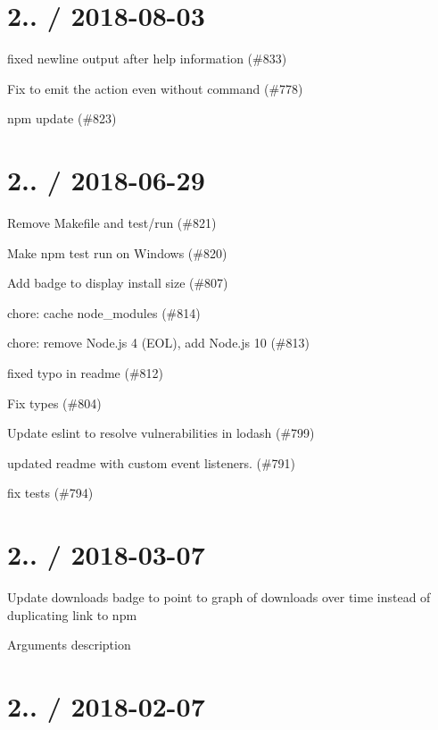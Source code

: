 \section*{2.. / 2018-\/08-\/03 }


\begin{DoxyItemize}
\item fixed newline output after help information (\#833)
\item Fix to emit the action even without command (\#778)
\item npm update (\#823)
\end{DoxyItemize}

\section*{2.. / 2018-\/06-\/29 }


\begin{DoxyItemize}
\item Remove Makefile and {\ttfamily test/run} (\#821)
\item Make \textquotesingle{}npm test\textquotesingle{} run on Windows (\#820)
\item Add badge to display install size (\#807)
\item chore\+: cache node\+\_\+modules (\#814)
\item chore\+: remove Node.\+js 4 (E\+OL), add Node.\+js 10 (\#813)
\item fixed typo in readme (\#812)
\item Fix types (\#804)
\item Update eslint to resolve vulnerabilities in lodash (\#799)
\item updated readme with custom event listeners. (\#791)
\item fix tests (\#794)
\end{DoxyItemize}

\section*{2.. / 2018-\/03-\/07 }


\begin{DoxyItemize}
\item Update downloads badge to point to graph of downloads over time instead of duplicating link to npm
\item Arguments description
\end{DoxyItemize}

\section*{2.. / 2018-\/02-\/07 }


